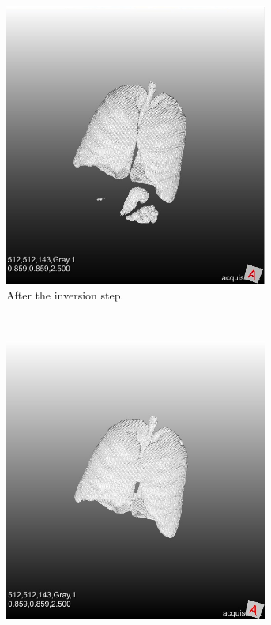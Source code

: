 \documentclass[a4paper,10pt]{article}
\numberwithin{equation}{section} %
\numberwithin{figure}{section} %
\numberwithin{table}{section} %
\begin{document}
\begin{figure}[h]
	\centering
    ~ %
    \begin{subfigure}[b]{0.42\textwidth}
        \includegraphics[width=0.95\textwidth]{lungs_with_meuk}
        \caption{After the inversion step.}
        \label{fig:lung-meuk}
    \end{subfigure}
    ~ %
    \begin{subfigure}[b]{0.42\textwidth}
        \includegraphics[width=0.95\textwidth]{lungs_without_meuk}

\end{subfigure}
\end{figure}
\end{document}
